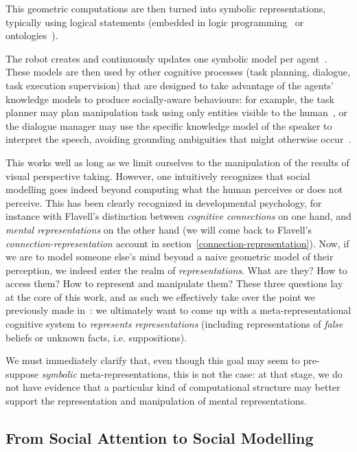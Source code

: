 \documentclass[a4paper]{article}
\newcommand{\ie}{i.e.\xspace}
\begin{document}
This geometric computations are then turned into symbolic representations,
typically using logical statements (embedded in logic
programming~\cite{tenorth2009knowrob} or ontologies~\cite{lemaignan2010oro}).

The robot creates and continuously updates one symbolic model per
agent~\cite{lemaignan2010oro}. These models are then used by other cognitive
processes (task planning, dialogue, task execution supervision) that are
designed to take advantage of the agents' knowledge models to produce
socially-aware behaviours: for example, the task planner may plan manipulation
task using only entities visible to the human~\cite{lallement2014hatp}, or the
dialogue manager may use the specific knowledge model of the speaker to
interpret the speech, avoiding grounding ambiguities that might otherwise
occur~\cite{lemaignan2011grounding}.

This works well as long as we limit ourselves to the manipulation of the results
of visual perspective taking. However, one intuitively recognizes that social
modelling goes indeed beyond computing what the human perceives or does not
perceive. This has been clearly recognized in developmental psychology, for
instance with Flavell's distinction between \emph{cognitive connections} on one
hand, and \emph{mental representations} on the other hand (we will come back to
Flavell's \emph{connection-representation} account in
section~\ref{connection-representation}). Now, if we are to model someone else's
mind beyond a naive geometric model of their perception, we indeed enter the
realm of \emph{representations}. What are they? How to access them? How to
represent and manipulate them? These three questions lay at the core of this
work, and as such we effectively take over the point we previously made
in~\cite{lemaignan2015mutual}:  we ultimately want to come up with a
meta-representational cognitive system to \emph{represents
representations} (including representations of \emph{false} beliefs or unknown
facts, \ie suppositions).

We must immediately clarify that, even though this goal may seem to pre-suppose
\emph{symbolic} meta-representations, this is not the case: at that stage, we do
not have evidence that a particular kind of computational structure may better
support the representation and manipulation of mental representations.

\subsection{From Social Attention to Social Modelling}
\end{document}
